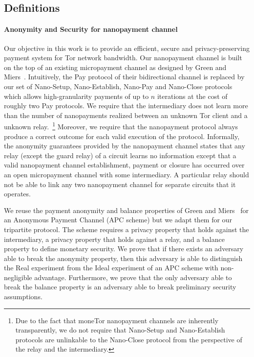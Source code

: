 
\subsection{Definitions}

\paragraph*{Anonymity and Security for nanopayment channel}
Our objective in this work is to provide an efficient, secure and
privacy-preserving payment system for Tor network bandwidth. Our nanopayment
channel is built on the top of an existing micropayment channel as designed by
Green and Miers~\cite{green2017bolt}. Intuitively, the Pay protocol of their
bidirectional channel is replaced by our set of Nano-Setup, Nano-Establish,
Nano-Pay and Nano-Close protocols which allows high-granularity payments of up
to $n$ iterations at the cost of roughly two Pay protocols.
We require that the intermediary does not learn more than the number of
nanopayments realized between an unknown Tor client and a unknown
relay.~\footnote{Due to the fact that moneTor nanopayment channels are
  inherently transparently, we do not require that Nano-Setup and Nano-Establish
  protocols are unlinkable to the Nano-Close protocol from the perspective of
  the relay and the intermediary.} Moreover, we require that the nanopayment
protocol always produce a correct outcome for each valid execution of the
protocol.  Informally, the anonymity guarantees provided by the nanopayment
channel states that any relay (except the guard relay) of a circuit learns no
information except that a valid nanopayment channel establishment, payment or
closure has occurred over an open micropayment channel with some intermediary. A
particular relay should not be able to link any two nanopayment channel for
separate circuits that it operates.

We reuse the payment anonymity and balance properties of Green and
Miers~\cite{bolt-eprint} for an Anonymous Payment Channel (APC scheme) but we
adapt them for our tripartite protocol. The scheme requires a privacy property
that holds against the intermediary, a privacy property that holds against a
relay, and a balance property to define monetary security.  We prove that if
there exists an adversary able to break the anonymity property, then this
adversary is able to distinguish the Real experiment from the Ideal experiment
of an APC scheme with non-negligible advantage. Furthermore, we prove that the
only adversary able to break the balance property is an adversary able to break
preliminary security assumptions.

